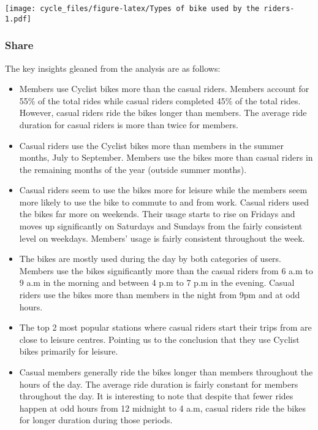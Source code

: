 \documentclass[
]{article}
\begin{document}
\texttt{[image: cycle\_files/figure-latex/Types of bike used by the riders-1.pdf]}

\hypertarget{share}{%
\subsubsection{Share}\label{share}}

The key insights gleaned from the analysis are as follows:

\begin{itemize}
\item
  Members use Cyclist bikes more than the casual riders. Members account
  for 55\% of the total rides while casual riders completed 45\% of the
  total rides. However, casual riders ride the bikes longer than
  members. The average ride duration for casual riders is more than
  twice for members.
\item
  Casual riders use the Cyclist bikes more than members in the summer
  months, July to September. Members use the bikes more than casual
  riders in the remaining months of the year (outside summer months).
\item
  Casual riders seem to use the bikes more for leisure while the members
  seem more likely to use the bike to commute to and from work. Casual
  riders used the bikes far more on weekends. Their usage starts to rise
  on Fridays and moves up significantly on Saturdays and Sundays from
  the fairly consistent level on weekdays. Members' usage is fairly
  consistent throughout the week.
\item
  The bikes are mostly used during the day by both categories of users.
  Members use the bikes significantly more than the casual riders from 6
  a.m to 9 a.m in the morning and between 4 p.m to 7 p.m in the evening.
  Casual riders use the bikes more than members in the night from 9pm
  and at odd hours.
\item
  The top 2 most popular stations where casual riders start their trips
  from are close to leisure centres. Pointing us to the conclusion that
  they use Cyclist bikes primarily for leisure.
\item
  Casual members generally ride the bikes longer than members throughout
  the hours of the day. The average ride duration is fairly constant for
  members throughout the day. It is interesting to note that despite
  that fewer rides happen at odd hours from 12 midnight to 4 a.m, casual
  riders ride the bikes for longer duration during those periods.
\end{itemize}
\end{document}
